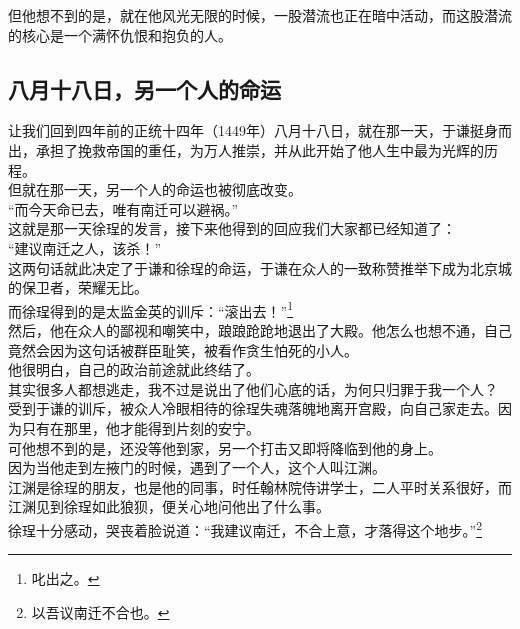 \begin{multicols}{\theparacolNo}
但他想不到的是，就在他风光无限的时候，一股潜流也正在暗中活动，而这股潜流的核心是一个满怀仇恨和抱负的人。\\

\subsection{八月十八日，另一个人的命运}
让我们回到四年前的正统十四年（1449年）八月十八日，就在那一天，于谦挺身而出，承担了挽救帝国的重任，为万人推崇，并从此开始了他人生中最为光辉的历程。\\

但就在那一天，另一个人的命运也被彻底改变。\\

“而今天命已去，唯有南迁可以避祸。”\\

这就是那一天徐珵的发言，接下来他得到的回应我们大家都已经知道了：\\

“建议南迁之人，该杀！”\\

这两句话就此决定了于谦和徐珵的命运，于谦在众人的一致称赞推举下成为北京城的保卫者，荣耀无比。\\

而徐珵得到的是太监金英的训斥：“滚出去！”\footnote{叱出之。}\\

然后，他在众人的鄙视和嘲笑中，踉踉跄跄地退出了大殿。他怎么也想不通，自己竟然会因为这句话被群臣耻笑，被看作贪生怕死的小人。\\

他很明白，自己的政治前途就此终结了。\\

其实很多人都想逃走，我不过是说出了他们心底的话，为何只归罪于我一个人？\\

受到于谦的训斥，被众人冷眼相待的徐珵失魂落魄地离开宫殿，向自己家走去。因为只有在那里，他才能得到片刻的安宁。\\

可他想不到的是，还没等他到家，另一个打击又即将降临到他的身上。\\

因为当他走到左掖门的时候，遇到了一个人，这个人叫江渊。\\

江渊是徐珵的朋友，也是他的同事，时任翰林院侍讲学士，二人平时关系很好，而江渊见到徐珵如此狼狈，便关心地问他出了什么事。\\

徐珵十分感动，哭丧着脸说道：“我建议南迁，不合上意，才落得这个地步。”\footnote{以吾议南迁不合也。}\\


\end{multicols}
